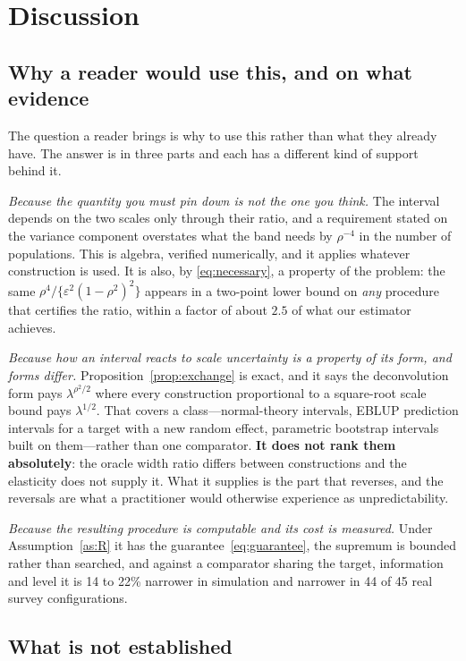 \section{Discussion}\label{sec:discussion}

\subsection{Why a reader would use this, and on what evidence}

The question a reader brings is why to use this rather than what they already
have. The answer is in three parts and each has a different kind of support
behind it.

\emph{Because the quantity you must pin down is not the one you think.} The
interval depends on the two scales only through their ratio, and a requirement
stated on the variance component overstates what the band needs by $\rho^{-4}$ in
the number of populations. This is algebra, verified numerically, and it applies
whatever construction is used. It is also, by \eqref{eq:necessary}, a property of
the problem: the same $\rho^4/\{\varepsilon^2(1-\rho^2)^2\}$ appears in a
two-point lower bound on \emph{any} procedure that certifies the ratio, within a
factor of about $2.5$ of what our estimator achieves.

\emph{Because how an interval reacts to scale uncertainty is a property of its
form, and forms differ.} Proposition~\ref{prop:exchange} is exact, and it says
the deconvolution form pays $\lambda^{\rho^2/2}$ where every construction
proportional to a square-root scale bound pays $\lambda^{1/2}$. That covers a
class---normal-theory intervals, EBLUP prediction intervals for a target with a
new random effect, parametric bootstrap intervals built on them---rather than one
comparator. \textbf{It does not rank them absolutely}: the oracle width ratio
differs between constructions and the elasticity does not supply it. What it
supplies is the part that reverses, and the reversals are what a practitioner
would otherwise experience as unpredictability.

\emph{Because the resulting procedure is computable and its cost is measured.}
Under Assumption~\ref{as:R} it has the guarantee~\eqref{eq:guarantee}, the
supremum is bounded rather than searched, and against a comparator sharing the
target, information and level it is 14 to 22\% narrower in simulation and
narrower in 44 of 45 real survey configurations.

\subsection{What is not established}

